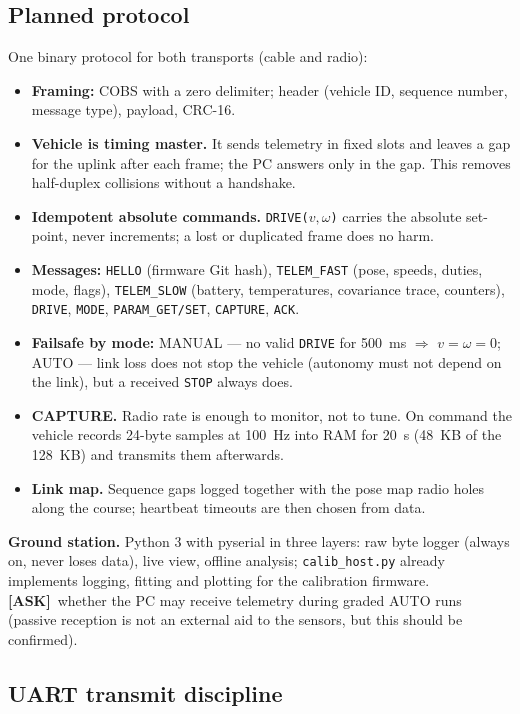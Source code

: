 \documentclass[11pt,a4paper]{article}
\newcommand{\mk}[2]{\textsf{\scriptsize\bfseries\colorbox{#1bg}{\color{#1}[#2]}}}
\newcommand{\ASK}{\mk{good}{ASK}}
\newcommand{\code}[1]{\texttt{\small #1}}
\begin{document}
\subsection{Planned protocol}\label{sec:protocol}

One binary protocol for both transports (cable and radio):
\begin{itemize}[leftmargin=6mm]
\item \textbf{Framing:} COBS with a zero delimiter; header (vehicle ID, sequence
number, message type), payload, CRC-16.
\item \textbf{Vehicle is timing master.} It sends telemetry in fixed slots and
leaves a gap for the uplink after each frame; the PC answers only in the gap.
This removes half-duplex collisions without a handshake.
\item \textbf{Idempotent absolute commands.} \code{DRIVE($v,\omega$)} carries the
absolute set-point, never increments; a lost or duplicated frame does no harm.
\item \textbf{Messages:} \code{HELLO} (firmware Git hash), \code{TELEM\_FAST}
(pose, speeds, duties, mode, flags), \code{TELEM\_SLOW} (battery, temperatures,
covariance trace, counters), \code{DRIVE}, \code{MODE}, \code{PARAM\_GET/SET},
\code{CAPTURE}, \code{ACK}.
\item \textbf{Failsafe by mode:} MANUAL --- no valid \code{DRIVE} for
\qty{500}{ms} $\Rightarrow$ $v=\omega=0$; AUTO --- link loss does not stop the
vehicle (autonomy must not depend on the link), but a received \code{STOP}
always does.
\item \textbf{CAPTURE.} Radio rate is enough to monitor, not to tune. On command
the vehicle records 24-byte samples at \qty{100}{Hz} into RAM for \qty{20}{s}
(\qty{48}{KB} of the \qty{128}{KB}) and transmits them afterwards.
\item \textbf{Link map.} Sequence gaps logged together with the pose map radio
holes along the course; heartbeat timeouts are then chosen from data.
\end{itemize}

\textbf{Ground station.} Python 3 with pyserial in three layers: raw byte logger
(always on, never loses data), live view, offline analysis; \code{calib\_host.py}
already implements logging, fitting and plotting for the calibration firmware.
\ASK\ whether the PC may receive telemetry during graded AUTO runs (passive
reception is not an external aid to the sensors, but this should be confirmed).

\subsection{UART transmit discipline}
\end{document}
